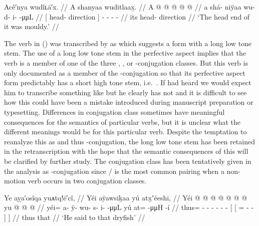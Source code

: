 \ex\label{ex:099-11-head-mouldy}%
%
\begingl
	\glpreamble	Acê′nya wudîʟā′x. //
	\glpreamble	A shanyaa wuditlaax̱. //
	\gla	{} A  @ {} {}  @ {} @ {} @ {} @ {} //
	\glb	{} a shá- niÿaa {} wu- d- i-  -μμL //
	\glc	{}[  head- direction {}] - - -  - //
	\gld	{} its head- direction {}  {} {} {} {} //
	\glft	‘The head end of it was mouldy.’
		//
\endgl
\xe

The verb in (\lastx) was transcribed by \citeauthor{swanton:1909} as  which suggests a form  with a long low tone  stem.
The use of a long low tone  stem in the perfective aspect implies that the verb is a member of one of the three , , or -conjugation classes.
But this verb is only documented as a member of the -conjugation \parencites[08/142]{leer:1973}[471]{leer:1976}[258]{edwards:2009} so that its perfective aspect form predictably has a short high tone  stem, i.e.\ .
If \citeauthor{swanton:1909} had heard  we would expect him to transcribe something like  but he clearly has  not  and it is difficult to see how this could have been a mistake introduced during manuscript preparation or typesetting.
Differences in conjugation class sometimes have meaningful consequences for the semantics of particular verbs, but it is unclear what the different meanings would be for this particular verb.
Despite the temptation to reanalyze this as  and thus -conjugation, the long low tone  stem has been retained in the retranscription with the hope that the semantic consequences of this will be clarified by further study.
The conjugation class has been tentatively given in the analysis as -conjugation since / is the most common pairing when a non-motion verb occurs in two conjugation classes.

\ex\label{ex:099-12-he-says-to-dryfish}%
%
\begingl
	\glpreamble	Ye aỵa′osîqa yuᴀtq!ē′cî, //
	\glpreamble	Yéi aÿawsiḵaa yú atx̱ʼéeshi, //
	\gla	Yéi @  @ {} @ {} @ {} @ {} @ {} @ {}
		{} yu {}  @ {} @ {} @ {} {} {} //
	\glb	yéi= a- ÿ- wu- s- i-  -μμL
		{} yú {} at=  -μμH -í {} {} //
	\glc	thus= - - - - -  -
		{}[  {}[ =  - - {}] {}] //
	\gld	thus  {} {} {} {} {} {}
		{} that {}  {} {} {} {} {} //
	\glft	‘He said to that dryfish’
		//
\endgl
\xe

